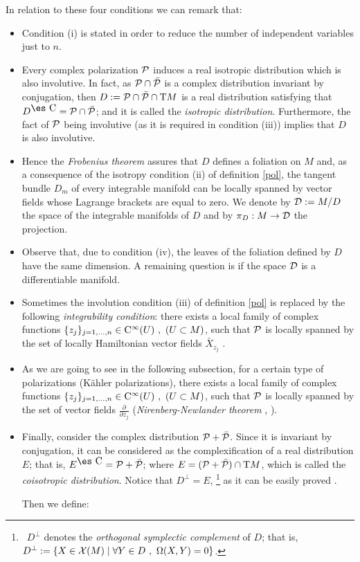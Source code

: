 \documentclass[12pt]{article}
\def\dst{\(}
\def\derpar#1#2{\frac{\partial{#1}}{\partial{#2}}}
\def\P{{\cal P}}
\def\D{{\cal D}}
\def\Complex{\mbox{\es C}}
\def\Tan{{\rm T}}
\def\Cinfty{{\rm C}^\infty}
\begin{document}
In relation to these four conditions we can remark that:
\begin{itemize}
\item
Condition (i) is stated in order to reduce
the number of independent variables just to $n$.
\item
Every complex polarization $\P$ induces a
real isotropic distribution which is also involutive.
In fact, as $\P \cap \bar \P$
is a complex distribution invariant by conjugation, then
$D := \P \cap \bar \P \cap \Tan M$
is a real distribution satisfying that
$D^{\Complex} = \P \cap \bar \P$;
and it is called the {\it isotropic distribution}.
Furthermore, the fact of $\P$ being involutive
(as it is required in condition (iii)) implies that $D$
is also involutive.
\item
Hence the {\it Frobenius theorem\/}
assures that $D$ defines a foliation on $M$ and,
as a consequence of the isotropy condition
(ii) of definition \ref{pol},
the tangent bundle $D_m$ of every integrable manifold can be locally
spanned by
vector fields whose Lagrange brackets are equal to zero.
We denote by $\D := M/D$
the space of the integrable manifolds of $D$ and by
$\pi_D : M \to \D$ the projection.
\item
Observe that, due to condition (iv),
the leaves of the foliation defined by $D$
have the same dimension.
A remaining question is if the space ${\cal D}$
is a differentiable manifold.
\item
Sometimes the involution condition (iii) of definition \ref{pol}
is replaced by the following {\it integrability condition}:
there exists a local family of complex functions
$\{ z_j \}_{j=1, \ldots ,n} \in \Cinfty (U) \ ,\ (U \subset M)$,
such that $\P$ is locally spanned by
the set of locally Hamiltonian vector fields $\bar X_{z_j}$
\cite{Wo-80}.
\item
As we are going to see in the following subsection,
for a certain type of polarizations (K\"ahler polarizations),
there exists a local family of complex functions
$\{ z_j \}_{j=1, \ldots ,n} \in \Cinfty (U) \ ,\ (U \subset M)$,
such that $\P$ is locally spanned by
the set of vector fields \dst\derpar{}{\bar z_j}\)
({\it Nirenberg-Newlander theorem}
\cite{Ho-ica}, \cite{NN-cac} ).
\item
Finally, consider the complex distribution
$\P + \bar \P$.
Since it is invariant by conjugation,
it can be considered as the complexification
of a real distribution $E$; that is,
$E^{\Complex} = \P + \bar \P$;
where $E = (\P + \bar \P) \cap \Tan M$,
which is called the
{\it coisotropic distribution}.
Notice that $D^{\perp} = E$,%
\footnote
{\ $D^{\perp}$
denotes the
{\it orthogonal symplectic complement\/}
of $D$; that is,
$D^{\perp} := \{ X \in {\cal X}(M) \mid
\forall Y \in D \ , \ \Omega (X,Y) = 0 \}$.}
as it can be easily proved \cite{Ki-gq}.

Then we define:
\end{itemize}
\end{document}

